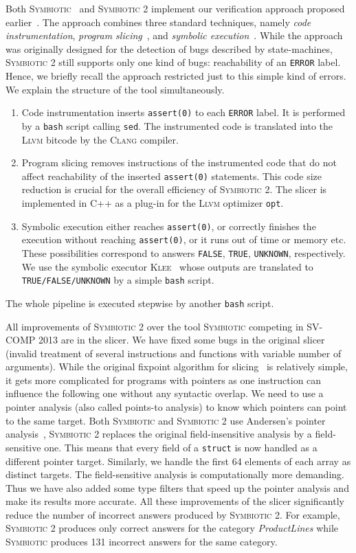 \documentclass[10pt]{llncs}
\newcommand\tool{\textsc{Symbiotic}\xspace}
\newcommand\klee{\textsc{Klee}\xspace}
\begin{document}
Both \tool~\cite{SST13} and \tool 2 implement our verification approach
proposed earlier~\cite{sse}. The approach combines three standard techniques,
namely \emph{code instrumentation}, \emph{program slicing}~\cite{weiser}, and
\emph{symbolic execution}~\cite{king}. While the approach was originally
designed for the detection of bugs described by state-machines, \tool 2 still
supports only one kind of bugs: reachability of an \texttt{ERROR} label.
Hence, we briefly recall the approach restricted just to this simple kind of
errors. We explain the structure of the tool simultaneously.
\begin{enumerate}
\item Code instrumentation inserts \texttt{assert(0)} to each \texttt{ERROR}
  label. It is performed by a \texttt{bash} script calling \texttt{sed}. The
  instrumented code is translated into the \textsc{Llvm} bitcode by
  the \textsc{Clang} compiler.
\item Program slicing removes instructions of the instrumented code that do
  not affect reachability of the inserted \texttt{assert(0)}
  statements. This code size reduction is crucial for the overall efficiency
  of \tool 2. The slicer is implemented in C++ as a plug-in for the
  \textsc{Llvm} optimizer \texttt{opt}.
\item Symbolic execution either reaches \texttt{assert(0)}, or correctly
  finishes the execution without reaching \texttt{assert(0)}, or it runs out
  of time or memory etc. These possibilities correspond to answers
  \texttt{FALSE}, \texttt{TRUE}, \texttt{UNKNOWN}, respectively.
  We use the symbolic executor \klee~\cite{klee} whose outputs are translated
  to \texttt{TRUE/FALSE/UNKNOWN} by a simple \texttt{bash} script.
\end{enumerate}
The whole pipeline is executed stepwise by another \texttt{bash} script.

All improvements of \tool 2 over the tool \tool competing in SV-COMP 2013
are in the slicer.  We have fixed some bugs in the original slicer (invalid
treatment of several instructions and functions with variable number of
arguments). While the original fixpoint algorithm for slicing~\cite{weiser}
is relatively simple, it gets more complicated for programs with pointers as
one instruction can influence the following one without any syntactic
overlap. We need to use a pointer analysis (also called points-to analysis)
to know which pointers can point to the same target. Both \tool and \tool 2
use Andersen's pointer analysis~\cite{And94}, \tool 2 replaces the original
field-insensitive analysis by a field-sensitive one. This means that every
field of a \texttt{struct} is now handled as a different pointer
target. Similarly, we handle the first 64 elements of each array as distinct
targets. The field-sensitive analysis is computationally more
demanding. Thus we have also added some type filters that speed up the
pointer analysis and make its results more accurate. All these improvements
of the slicer significantly reduce the number of incorrect answers produced
by \tool 2. For example, \tool 2 produces only correct answers for the
category \emph{ProductLines} while \tool produces 131 incorrect answers for
the same category.
\end{document}
